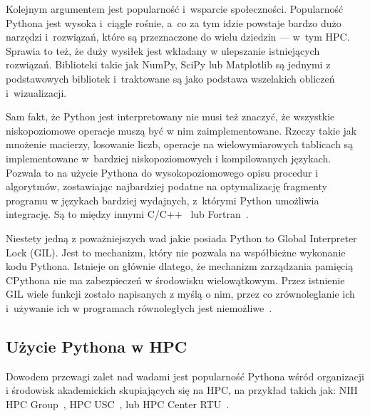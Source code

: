 Kolejnym argumentem jest popularność i~wsparcie społeczności.
Popularność Pythona jest wysoka i~ciągle rośnie,
a~co za tym idzie powstaje bardzo dużo narzędzi i~rozwiązań,
które są przeznaczone do wielu dziedzin --- w~tym HPC\@.
Sprawia to też, że duży wysiłek jest wkładany
w ulepszanie istniejących rozwiązań.
Biblioteki takie jak NumPy, SciPy lub Matplotlib są
jednymi z podstawowych bibliotek i~traktowane są jako
podstawa wszelakich obliczeń i~wizualizacji.

Sam fakt, że Python jest interpretowany nie musi
też znaczyć, że wszystkie niskopoziomowe operacje
muszą być w nim zaimplementowane.
Rzeczy takie jak mnożenie macierzy, losowanie liczb,
operacje na wielowymiarowych tablicach są implementowane
w~bardziej niskopoziomowych i kompilowanych językach.
Pozwala to na użycie Pythona do wysokopoziomowego opisu
procedur i algorytmów, zostawiając najbardziej podatne
na optymalizację fragmenty programu w językach bardziej
wydajnych, z~którymi Python umożliwia integrację.
Są to między innymi C/C++~\cite{python_c_cpp} lub
Fortran~\cite{python_f2py}.

Niestety jedną z poważniejszych wad jakie posiada Python
to Global Interpreter Lock (GIL).
Jest to mechanizm, który nie pozwala na współbieżne wykonanie
kodu Pythona.
Istnieje on głównie dlatego, że mechanizm zarządzania
pamięcią CPythona nie ma zabezpieczeń w środowisku wielowątkowym.
Przez istnienie GIL wiele funkcji zostało napisanych
z myślą o nim, przez co zrównoleglanie ich
i~używanie ich w programach równoległych
jest niemożliwe~\cite{python_gil}.

\subsection{Użycie Pythona w HPC}

Dowodem przewagi zalet nad wadami jest popularność Pythona
wśród organizacji i środowisk akademickich
skupiających się na HPC\@, na przykład takich jak:
NIH HPC Group~\cite{nih_hpc},
HPC USC~\cite{hpc_usc}, lub
HPC Center RTU~\cite{hpc_rtu}.
